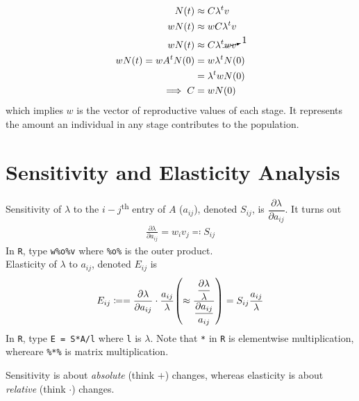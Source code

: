 \documentclass{article}
\begin{document}
        \begin{align}
            N(t) &\approx C \lambda^t v \\
            wN(t) &\approx w C \lambda^t v \\
            wN(t) &\approx C\lambda^t \cancelto{1}{wv} \\
            w N(t) = w A^t N(0) &= w \lambda^t N(0) \\
            &= \lambda^t w N(0) \\
            \implies C &= wN(0)
        \end{align}
        which implies $w$ is the vector of reproductive values of each stage.  It represents the amount an individual in any stage contributes to the population.

    \section{Sensitivity and Elasticity Analysis}
        Sensitivity of $\lambda$ to the $i-j$\textsuperscript{th} entry of $A$ ($a_{ij}$), denoted $S_{ij}$, is $\dfrac{\partial \lambda}{\partial a_{ij}}$.  It turns out
        \begin{align}
            \frac{\partial \lambda}{\partial a_{ij}} = w_iv_j \eqqcolon S_{ij}
        \end{align}
        In \texttt{R}, type \texttt{w\%o\%v} where \texttt{\%o\%} is the outer product. \\

        Elasticity of $\lambda$ to $a_{ij}$, denoted $E_{ij}$ is
        \begin{align}
            E_{ij} \coloneqq = \frac{\partial \lambda}{\partial a_{ij}} \cdot \frac{a_{ij}}{\lambda} \qty(\approx \frac{\dfrac{\partial \lambda}{\lambda}}{\dfrac{\partial a_{ij}}{a_{ij}}}) = S_{ij} \frac{a_{ij}}{\lambda}
        \end{align}
        In \texttt{R}, type \texttt{E = S*A/l} where \texttt{l} is $\lambda$.  Note that \texttt{*} in \texttt{R} is elementwise multiplication, whereare \texttt{\%*\%} is matrix multiplication.

        Sensitivity is about \emph{absolute} (think $+$) changes, whereas elasticity is about \emph{relative} (think $\cdot$) changes.
\end{document}
